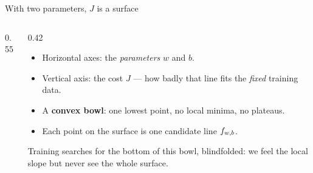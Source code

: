 \documentclass[aspectratio=169,10pt]{beamer}
\begin{document}
\begin{frame}{With two parameters, $J$ is a surface}
  \begin{columns}[T,onlytextwidth]
    \begin{column}{0.55\textwidth}
      \centering
    \end{column}
    \begin{column}{0.42\textwidth}
      \footnotesize
      \begin{itemize}
        \item Horizontal axes: the \emph{parameters} $w$ and $b$.
        \item Vertical axis: the cost $J$ --- how badly that line fits the
              \emph{fixed} training data.
        \item A \textbf{convex bowl}: one lowest point, no local minima, no
              plateaus.
        \item Each point on the surface is one candidate line $f_{w,b}$.
      \end{itemize}
      \begin{keyidea}
        Training searches for the bottom of this bowl, blindfolded: we feel the
        local slope but never see the whole surface.
      \end{keyidea}
    \end{column}
  \end{columns}
\end{frame}
\end{document}
